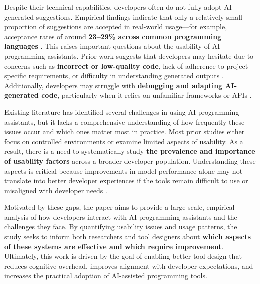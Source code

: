 Despite their technical capabilities, developers often do not fully adopt AI-generated suggestions. Empirical findings indicate that only a relatively small proportion of suggestions are accepted in real-world usage—for example, acceptance rates of around \textbf{23–29\% across common programming languages} \cite{ziegler2022productivity}. This raises important questions about the usability of AI programming assistants. Prior work suggests that developers may hesitate due to concerns such as \textbf{incorrect or low-quality code}, lack of adherence to project-specific requirements, or difficulty in understanding generated outputs \cite{vaithilingam2022expectation}. Additionally, developers may struggle with \textbf{debugging and adapting AI-generated code}, particularly when it relies on unfamiliar frameworks or APIs \cite{xu2022inide}.

Existing literature has identified several challenges in using AI programming assistants, but it lacks a comprehensive understanding of how frequently these issues occur and which ones matter most in practice. Most prior studies either focus on controlled environments or examine limited aspects of usability. As a result, there is a need to systematically study \textbf{the prevalence and importance of usability factors} across a broader developer population. Understanding these aspects is critical because improvements in model performance alone may not translate into better developer experiences if the tools remain difficult to use or misaligned with developer needs \cite{myers2016programmers}.

Motivated by these gaps, the paper aims to provide a large-scale, empirical analysis of how developers interact with AI programming assistants and the challenges they face. By quantifying usability issues and usage patterns, the study seeks to inform both researchers and tool designers about \textbf{which aspects of these systems are effective and which require improvement}. Ultimately, this work is driven by the goal of enabling better tool design that reduces cognitive overhead, improves alignment with developer expectations, and increases the practical adoption of AI-assisted programming tools.

